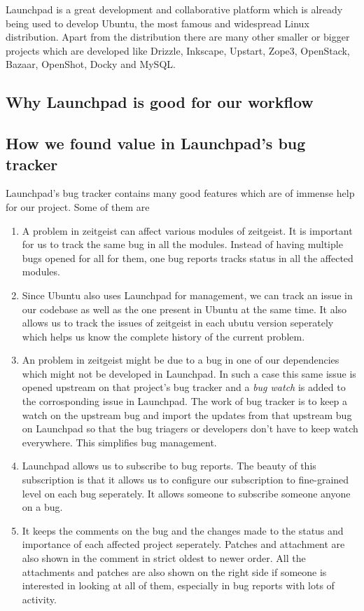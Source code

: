 Launchpad is a great development and collaborative platform which is already being used 
to develop Ubuntu, the most famous and widespread Linux distribution. Apart from the 
distribution there are many other smaller or bigger projects which are developed like 
Drizzle, Inkscape, Upstart, Zope3, OpenStack, Bazaar, OpenShot, Docky and MySQL.

\subsection{Why Launchpad is good for our workflow}
\subsection{How we found value in Launchpad's bug tracker}
Launchpad's bug tracker contains many good features which are of immense help for our 
project. Some of them are
\begin{enumerate}
\item A problem in zeitgeist can affect various modules of zeitgeist. It is important for 
us to track the same bug in all the modules. Instead of having multiple bugs opened for 
all for them, one bug reports tracks status in all the affected modules.
\item Since Ubuntu also uses Launchpad for management, we can track an issue in our codebase 
as well as the one present in Ubuntu at the same time. It also allows us to track the issues 
of zeitgeist in each ubutu version seperately which helps us know the complete history 
of the current problem.
\item An problem in zeitgeist might be due to a bug in one of our dependencies which might 
not be developed in Launchpad. In such a case this same issue is opened upstream on that 
project's bug tracker and a \textit{bug watch} is added to the corrosponding issue in Launchpad. 
The work of bug tracker is to keep a watch on the upstream bug and import the updates from that 
upstream bug on Launchpad so that the bug triagers or developers don't have to keep watch 
everywhere. This simplifies bug management.
\item Launchpad allows us to subscribe to bug reports. The beauty of this subscription is that 
it allows us to configure our subscription to fine-grained level on each bug seperately. It 
allows someone to subscribe someone anyone on a bug.
\item It keeps the comments on the bug and the changes made to the status and importance of 
each affected project seperately. Patches and attachment are also shown in the comment in 
strict oldest to newer order. All the attachments and patches are also shown on the right 
side if someone is interested in looking at all of them, especially in bug reports with lots 
of activity.
\end{enumerate}
